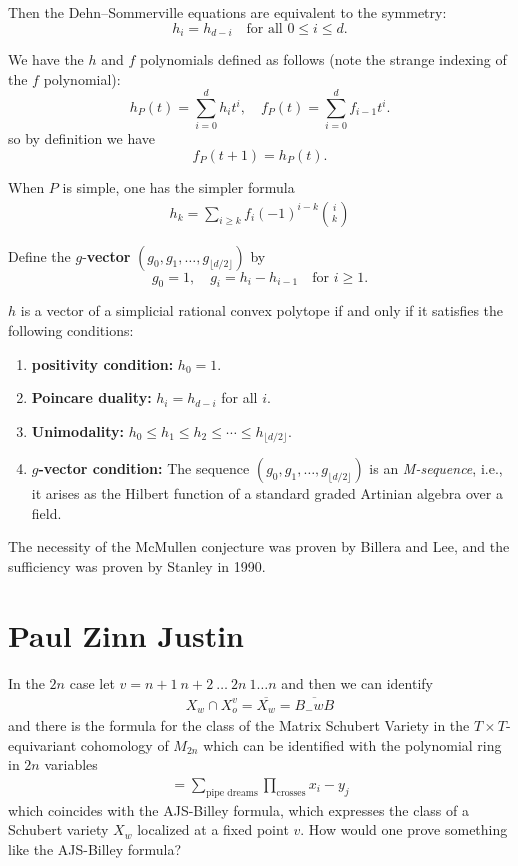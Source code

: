 \documentclass[12pt]{article}
\begin{document}
Then the Dehn--Sommerville equations are equivalent to the symmetry:
\[
h_i = h_{d - i} \quad \text{for all } 0 \leq i \leq d.
\]

\begin{definition}
    We have the $h$ and $f$ polynomials defined as follows (note the strange indexing of the $f$ polynomial):
    \[
        h_P(t) = \sum_{i=0}^d h_i t^i, \quad f_P(t) = \sum_{i=0}^d f_{i-1} t^i.
    \]
    so by definition we have
    \[
        f_P(t+1) = h_P(t).
    \]
\end{definition}
When $P$ is simple, one has the simpler formula \begin{align*}
    h_k = \sum_{i\geq k} f_i (-1)^{i-k} \binom{i}{k}
\end{align*}

\begin{definition}
    Define the \( g \)-\textbf{vector} \( (g_0, g_1, \dots, g_{\lfloor d/2 \rfloor}) \) by
\[
g_0 = 1, \quad g_i = h_i - h_{i - 1} \quad \text{for } i \geq 1.
\]
\end{definition}
\begin{theorem}
 $h$ is a vector of a simplicial rational convex polytope if and only if it satisfies the following conditions:
\begin{enumerate}
    \item \textbf{positivity condition:} $h_0 = 1$.
    \item \textbf{Poincare duality: }$h_i = h_{d-i}$ for all $i$.
    \item \textbf{Unimodality: }$h_0 \leq h_1 \leq h_2 \leq \cdots \leq h_{\lfloor d/2 \rfloor}$.
    \item \textbf{\( g \)-vector condition:} The sequence \( (g_0, g_1, \dots, g_{\lfloor d/2 \rfloor}) \) is an \emph{M-sequence}, i.e., it arises as the Hilbert function of a standard graded Artinian algebra over a field.
\end{enumerate}
\end{theorem}
The necessity of the McMullen conjecture was proven by Billera and Lee, and the sufficiency was proven by Stanley in 1990.

\section{Paul Zinn Justin}
In the $2n$ case let $v = n+1 \ n+2 \ \dots \ 2n \ 1 \dots n$ and then we can identify \begin{align*}
    X_w \cap X^v_o = \overline{X_w} = \overline{B_-wB}
\end{align*}
and there is the formula for the class of the Matrix Schubert Variety in the $T\times T$-equivariant cohomology of $M_{2n}$ which can be identified with the polynomial ring in $2n$ variables \begin{align*}
    [\overline{X_w}] = \sum_{\text{pipe dreams}} \prod_{\text{crosses}} x_i - y_j
\end{align*} 
which coincides with the AJS-Billey formula, which expresses the class of a Schubert variety $X_w$ localized at a fixed point $v$. How would one prove something like the AJS-Billey formula?
\end{document}
